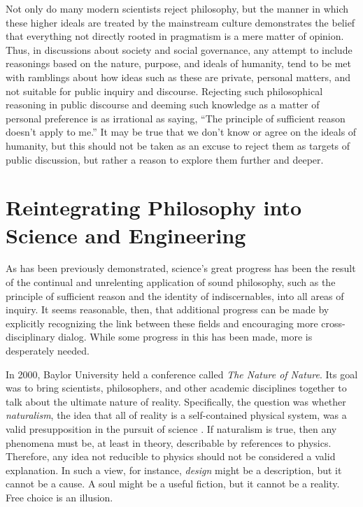 Not only do many modern scientists reject philosophy, but the manner in which these higher ideals are treated by the mainstream culture demonstrates the belief that everything not directly rooted in pragmatism is a mere matter of opinion.  
Thus, in discussions about society and social governance, any attempt to include reasonings based on the nature, purpose, and ideals of humanity, tend to be met with ramblings about how ideas such as these are private, personal matters, and not suitable for public inquiry and discourse.  Rejecting such philosophical reasoning in public discourse and deeming such knowledge as a matter of personal preference is as irrational as saying, ``The principle of sufficient reason doesn't apply to me.''  It may be true that we don't know or agree on the ideals of humanity, but this should not be taken as an excuse to reject them as targets of public discussion, but rather a reason to explore them further and deeper.

\section[Reintegrating Philosophy]{Reintegrating Philosophy into Science and Engineering}

As has been previously demonstrated, science's great progress has been the result of the continual and unrelenting application of sound philosophy, such as the principle of sufficient reason and the identity of indiscernables, into all areas of inquiry.  It seems reasonable, then, that additional progress can be made by explicitly recognizing the link between these fields and encouraging more cross-disciplinary dialog.  While some progress in this has been made, more is desperately needed.

In 2000, Baylor University held a conference called \textit{The Nature of Nature}.  Its goal was to bring scientists, philosophers, and other academic disciplines together to talk about the ultimate nature of reality.  Specifically, the question was whether \textit{naturalism}, the idea that all of reality is a self-contained physical system, was a valid presupposition in the pursuit of science \citep{gordondembski2011}.
If naturalism is true, then any phenomena must be, at least in theory, describable by references to physics.  Therefore, any idea not reducible to physics should not be considered a valid explanation.  In such a view, for instance, \textit{design} might be a description, but it cannot be a cause.  A soul might be a useful fiction, but it cannot be a reality.  Free choice is an illusion.  

